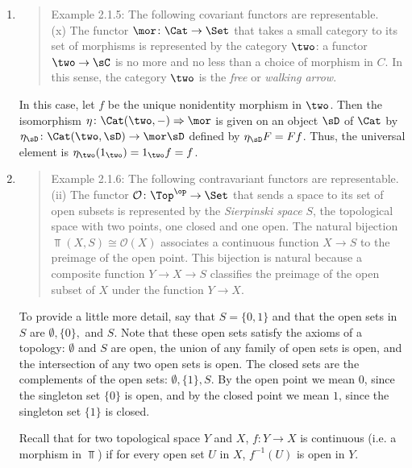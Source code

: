 \documentclass[../../main]{subfiles}
\begin{document}
\begin{enumerate}
\item 
\begin{quote}
Example 2.1.5: The following covariant functors are representable.\\
(x) The functor $\mor\colon \Cat\rightarrow\Set$ that takes a small category to its set of morphisms is represented by the category $\two$: a functor $\two\rightarrow\sC$ is no more and no less than a choice of morphism in $C$. In this sense, the category $\two$ is the \emph{free} or \emph{walking arrow}.
\end{quote}

In this case, let $f$ be the unique nonidentity morphism in $\two$. Then the 
isomorphism $\eta\colon \Cat(\two,-)\Rightarrow\mor$ is given on an object 
$\sD$ of $\Cat$ by $\eta_\sD\colon \Cat(\two,\sD)\rightarrow\mor\sD$ defined by 
$\eta_\sD F=Ff$. Thus, the universal element is $\eta_\two(1_\two)=1_\two f=f$.

\item 
\begin{quote}
Example 2.1.6: The following contravariant functors are representable.\\
(ii) The functor ${\mathcal O}\colon \Top^\op\rightarrow\Set$ that sends a 
space to its set of open subsets is represented by the \emph{Sierpinski space} 
$S$, the topological space with two points, one closed and one open. The 
natural bijection $\Top(X,S)\cong{\mathcal O}(X)$ associates a continuous 
function $X\rightarrow S$ to the preimage of the open point. This bijection is 
natural because a composite function $Y\rightarrow X\rightarrow S$ classifies 
the preimage of the open subset of $X$ under the function $Y\rightarrow X$.
\end{quote}

To provide a little more detail, say that $S=\{0,1\}$ and that the open sets in 
$S$ are $\emptyset,\{0\},$ and $S$. Note that these open sets satisfy the axioms 
of a topology: $\emptyset$ and $S$ are open, the union of any family of open 
sets is open, and the intersection of any two open sets is open. The closed 
sets are the complements of the open sets: $\emptyset, \{1\},S$. By the open 
point we mean $0$, since the singleton set $\{0\}$ is open, and by the closed 
point we mean $1$, since the singleton set $\{1\}$ is closed.

Recall that for two topological space $Y$ and $X$, $f\colon Y\rightarrow X$ is continuous (i.e. a morphism in $\Top$) if for every open set $U$ in $X$, $f^{-1}(U)$ is open in $Y$. 


\end{enumerate}
\end{document}
